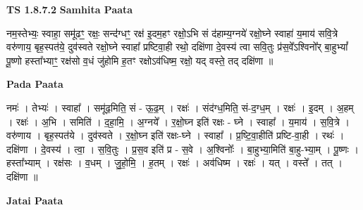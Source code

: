 \documentclass[17pt]{extarticle}
\begin{document}
\textbf{TS 1.8.7.2 } \newline
\textbf{Samhita Paata} \newline

नम॒स्तेभ्यः॒ स्वाहा॒ समू॑ढꣳ॒॒ रक्षः॒ सन्द॑॑ग्धꣳ॒॒ रक्ष॑ इ॒दम॒हꣳ रक्षो॒ऽभि सं द॑हाम्य॒ग्नये॑ रक्षो॒घ्ने स्वाहा॑ य॒माय॑ सवि॒त्रे वरु॑णाय॒ बृह॒स्पत॑ये॒ दुव॑स्वते रक्षो॒घ्ने स्वाहा᳚ प्रष्टिवा॒ही रथो॒ दक्षि॑णा दे॒वस्य॑ त्वा सवि॒तुः प्र॑स॒वे᳚ऽश्विनो᳚र् बा॒हुभ्यां᳚ पू॒ष्णो हस्ता᳚भ्याꣳ॒॒ रक्ष॑सो व॒धं जु॑होमि ह॒तꣳ रक्षोऽव॑धिष्म॒ रक्षो॒ यद् वस्ते॒ तद् दक्षि॑णा ॥ \newline

\textbf{Pada Paata} \newline

नमः॑ । तेभ्यः॑ । स्वाहा᳚ । समू॑ढ॒मिति॒ सं - ऊ॒ढ॒म् । रक्षः॑ । संद॑ग्ध॒मिति॒ सं-द॒ग्ध॒म् । रक्षः॑ । इ॒दम् । अ॒हम् । रक्षः॑ । अ॒भि । समिति॑ । द॒हा॒मि॒ । अ॒ग्नये᳚ । र॒क्षो॒घ्न इति॑ रक्षः - घ्ने । स्वाहा᳚ । य॒माय॑ । स॒वि॒त्रे । वरु॑णाय । बृह॒स्पत॑ये । दुव॑स्वते । र॒क्षो॒घ्न इति॑ रक्षः-घ्ने । स्वाहा᳚ । प्र॒ष्टि॒वा॒हीति॑ प्रष्टि-वा॒ही । रथः॑ । दक्षि॑णा । दे॒वस्य॑ । त्वा॒ । स॒वि॒तुः । प्र॒स॒व इति॑ प्र - स॒वे । अ॒श्विनोः᳚ । बा॒हुभ्या॒मिति॑ बा॒हु-भ्या॒म् । पू॒ष्णः । हस्ता᳚भ्याम् । रक्ष॑सः । व॒धम् । जु॒हो॒मि॒ । ह॒तम् । रक्षः॑ । अव॑धिष्म । रक्षः॑ । यत् । वस्ते᳚ । तत् । दक्षि॑णा ॥  \newline



\textbf{Jatai Paata} \newline
\end{document}
